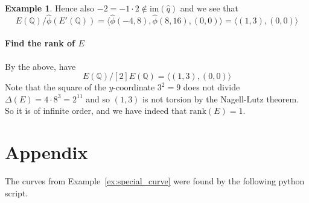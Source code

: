 \documentclass{scrartcl}
\newcommand{\Q}{\mathbb{Q}}
\newcommand{\im}{\mathrm{im}}
\theoremstyle{definition}
\newtheorem{example}[subsection]{Example}
\begin{document}
\begin{example}
    Hence also $-2 = -1 \cdot 2 \notin \im(\hat{q})$ and we see that
    \begin{equation*}
        E(\Q)/\hat{\phi}(E'(\Q)) = \langle \hat{\phi}(-4, 8), \hat{\phi}(8, 16), (0, 0) \rangle = \langle (1, 3), (0, 0) \rangle
    \end{equation*}

    \paragraph{Find the rank of $E$} By the above, have
    \begin{equation*}
        E(\Q)/[2]E(\Q) = \langle (1, 3), (0, 0) \rangle
    \end{equation*}
    Note that the square of the $y$-coordinate $3^2 = 9$ does not divide $\Delta(E) = 4 \cdot 8^3 = 2^{11}$ and so $(1, 3)$ is not torsion by the Nagell-Lutz theorem.
    So it is of infinite order, and we have indeed that $\mathrm{rank}(E) = 1$.
\end{example}

\section{Appendix}
The curves from Example~\ref{ex:special_curve} were found by the following python script.

\end{document}
